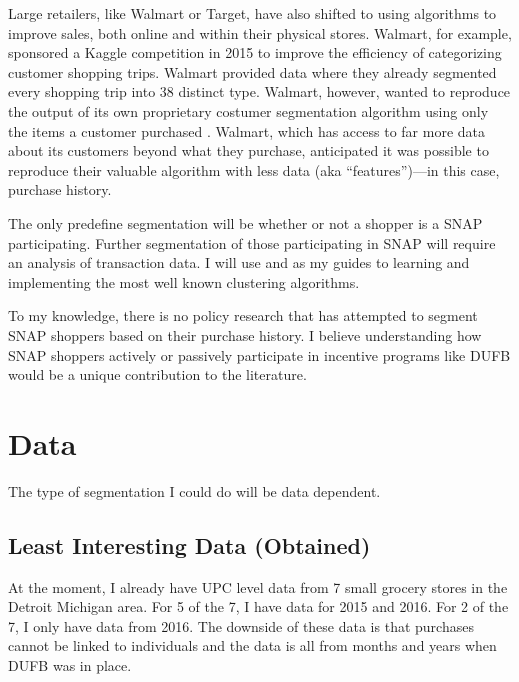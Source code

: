 \documentclass[12pt,letterpaperpaper,]{book}
\begin{document}
Large retailers, like Walmart or Target, have also shifted to using
algorithms to improve sales, both online and within their physical
stores. Walmart, for example, sponsored a Kaggle competition in 2015 to
improve the efficiency of categorizing customer shopping trips. Walmart
provided data where they already segmented every shopping trip into 38
distinct type. Walmart, however, wanted to reproduce the output of its
own proprietary costumer segmentation algorithm using only the items a
customer purchased \citep{walmart_data_2015}. Walmart, which has access
to far more data about its customers beyond what they purchase,
anticipated it was possible to reproduce their valuable algorithm with
less data (aka ``features'')---in this case, purchase history.

The only predefine segmentation will be whether or not a shopper is a
SNAP participating. Further segmentation of those participating in SNAP
will require an analysis of transaction data. I will use
\citet{friedman_elements_2001} and \citet{james_introduction_2013} as my
guides to learning and implementing the most well known clustering
algorithms.

To my knowledge, there is no policy research that has attempted to
segment SNAP shoppers based on their purchase history. I believe
understanding how SNAP shoppers actively or passively participate in
incentive programs like DUFB would be a unique contribution to the
literature.

\section*{Data}\label{data}

The type of segmentation I could do will be data dependent.

\subsection*{Least Interesting Data
(Obtained)}\label{least-interesting-data-obtained}

At the moment, I already have UPC level data from 7 small grocery stores
in the Detroit Michigan area. For 5 of the 7, I have data for 2015 and
2016. For 2 of the 7, I only have data from 2016. The downside of these
data is that purchases cannot be linked to individuals and the data is
all from months and years when DUFB was in place.
\end{document}
